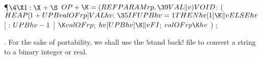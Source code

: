 \Y\P$\4\X1:\X\mathrel{+}\S$\6
\4$\\{OP}+\K=(\\{REF}\\{PARAM}\\{rp},\39\\{VAL}\|v)\\{VOID}$: ( $\\{HEAP}[1+%
\\{UPB}\\{val}\\{OF}\\{rp}]\\{VAL}\\{hv};\,\35\\{IF}\\{UPB}\\{hv}=1\\{THEN}%
\\{hv}[1]\K\|v\\{ELSE}\\{hv}$ [ : $\\{UPB}\\{hv}-1$ ] $\K\\{val}\\{OF}\\{rp}$;\5
$\\{hv}[\\{UPB}\\{hv}]\K\|v\\{FI}$;\5
$\\{val}\\{OF}\\{rp}\K\\{hv}$ ) ;\par
\fi

. For the sake of portability, we shall use the !stand back! file to
convert a string to a binary integer or real.

